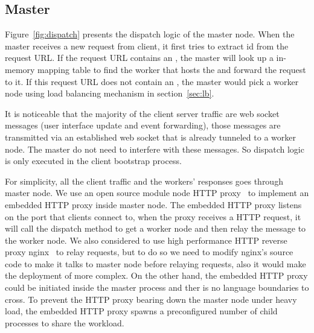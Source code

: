 \subsection{Master}
Figure~\ref{fig:dispatch} presents the dispatch logic of the master node.
When the master receives a new request from client,
it first tries to extract \appins{} id from the request URL.
If the request URL contains an \appins{},
the master will look up a in-memory mapping table to find the worker
that hosts the \appins{} and forward the request to it.
If this request URL does not contain an \appins{},
the master would pick a worker node using load balancing mechanism in section~\ref{sec:lb}.



It is noticeable that the majority of the client server traffic are
web socket messages (user interface update and event forwarding),
those messages are transmitted via an established web socket that is already tunneled to 
a worker node.
The master do not need to interfere with these messages.
So dispatch logic is only executed in the client bootstrap process.

For simplicity, all the client traffic and the workers' responses goes through master node.
We use an open source \nodejs{} module node HTTP proxy~\cite{nodeproxy} to implement
an embedded HTTP proxy inside master node.
The embedded HTTP proxy listens on the port that clients connect to,
when the proxy receives a HTTP request,
it will call the dispatch method to get a worker node and then relay the message
to the worker node.
We also considered to use high performance HTTP reverse proxy nginx~\cite{nginx}
to relay requests,
but to do so we need to modify nginx's source code to 
make it talks to master node before relaying requests,
also it would make the deployment of \cb{} more complex.
On the other hand, the embedded HTTP proxy could be initiated inside the master process
and ther is no language boundaries to cross.
To prevent the HTTP proxy bearing down the master node under heavy load,
the embedded HTTP proxy spawns a preconfigured number of child processes to share the workload.


